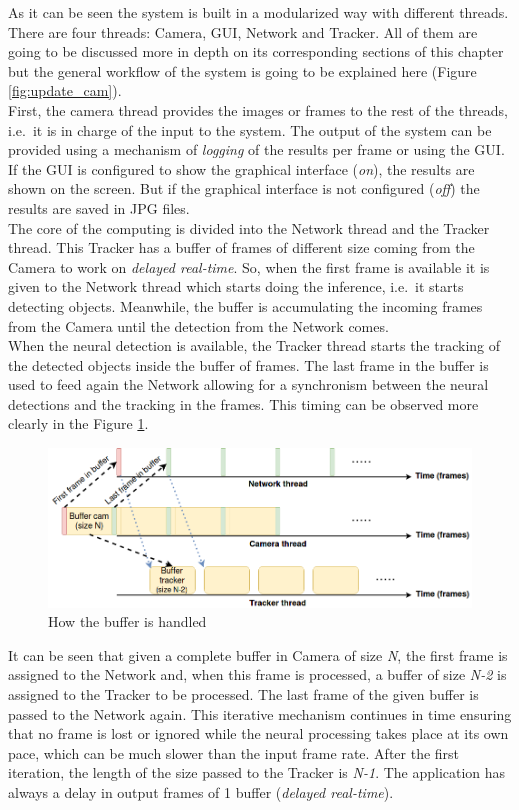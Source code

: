 As it can be seen the system is built in a modularized way with different threads. There are four threads: Camera, GUI, Network and Tracker. All of them are going to be discussed more in depth on its corresponding sections of this chapter but the general workflow of the system is going to be explained here (Figure \ref{fig:update_cam}).\\
First, the camera thread provides the images or frames to the rest of the threads, i.e.\ it is in charge of the input to the system. The output of the system can be provided using a mechanism of \textit{logging} of the results per frame or using the GUI. If the GUI is configured to show the graphical interface (\textit{on}), the results are shown on the screen. But if the graphical interface is not configured (\textit{off}) the results are saved in JPG files.\\ The core of the computing is divided into the Network thread and the Tracker thread. This Tracker has a buffer of frames of different size coming from the Camera to work on \textit{delayed real-time}. So, when the first frame is available it is given to the Network thread which starts doing the inference, i.e.\, it starts detecting objects. Meanwhile, the buffer is accumulating the incoming frames from the Camera until the detection from the Network comes.\\
When the neural detection is available, the Tracker thread starts the tracking of the detected objects inside the buffer of frames. The last frame in the buffer is used to feed again the Network allowing for a synchronism between the neural detections and the tracking in the frames. This timing can be observed more clearly in the Figure \ref{fig:buffer}.
\begin{figure}[H]
\begin{center}
\includegraphics[scale=0.4]{figures/buffer.png}
\caption{How the buffer is handled}
\label{fig:buffer}
\end{center}
\end{figure}
It can be seen that given a complete buffer in Camera of size \textit{N}, the first frame is assigned to the Network and, when this frame is processed, a buffer of size \textit{N-2} is assigned to the Tracker to be processed. The last frame of the given buffer is passed to the Network again. This iterative mechanism continues in time ensuring that no frame is lost or ignored while the neural processing takes place at its own pace, which can be much slower than the input frame rate. After the first iteration, the length of the size passed to the Tracker is \textit{N-1}. The application has always a delay in output frames of 1 buffer (\textit{delayed real-time}).
